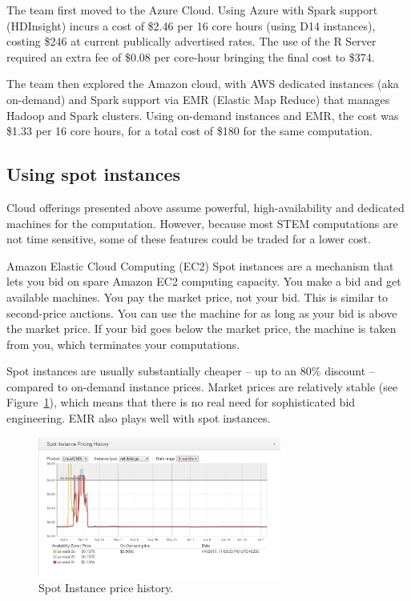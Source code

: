 \documentclass{acm_proc_article-sp}
\begin{document}
The team first moved to the Azure Cloud. Using Azure with Spark support (HDInsight) incurs a cost of \$2.46 per 16 core hours (using D14 instances), costing \$246 at current publically advertised rates. The use of the R Server required an extra fee of \$0.08 per core-hour bringing the final cost to \$374.

The team then explored the Amazon cloud, with AWS dedicated instances (aka on-demand) and Spark support via EMR (Elastic Map Reduce) that manages Hadoop and Spark clusters. Using on-demand instances and EMR, the cost was  \$1.33 per 16 core hours, for a total cost of  \$180 for the same computation.

\subsection{Using spot instances}
Cloud offerings presented above assume powerful,  high-availability and dedicated machines for the computation. However, because most STEM computations are not time sensitive, some of these features could be traded for a lower cost.

Amazon Elastic Cloud Computing (EC2) Spot instances are a mechanism that lets you bid on spare Amazon EC2 computing capacity. You make a bid and get available machines. You pay the market price, not your bid. This is similar to second-price auctions. You can use the machine for as long as your bid is above the market price. If your bid goes below the market price, the machine is taken from you, which terminates your computations. 

Spot instances are usually substantially cheaper -- up to an 80\% discount -- compared to on-demand instance prices. Market prices are relatively stable (see Figure~\ref{fig::spot-price-history}), which means that there is no real need for sophisticated bid engineering. EMR also plays well with spot instances.

\begin{figure}[h]
    \centering
    \includegraphics[width=8cm]{IMG/spot-price.jpg}
    \caption{Spot Instance price history.}
    \label{fig::spot-price-history}
\end{figure}
\end{document}
